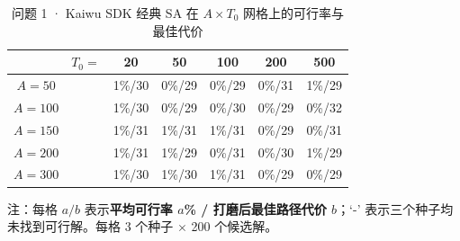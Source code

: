 \begin{table}[htbp]
  \centering
  \caption{问题 1 · Kaiwu SDK 经典 SA 在 $A \times T_0$ 网格上的可行率与最佳代价}
  \label{tab:q1_sens_A_T0}
  \begin{tabular}{ccccccc}
    \toprule
    & $T_0=$ & 20 & 50 & 100 & 200 & 500 \\
    \midrule
    $A=50$ & & 1\%/30 & 0\%/29 & 0\%/29 & 0\%/31 & 1\%/29 \\
    $A=100$ & & 1\%/30 & 0\%/29 & 0\%/30 & 0\%/29 & 0\%/32 \\
    $A=150$ & & 1\%/31 & 1\%/31 & 1\%/31 & 0\%/29 & 0\%/31 \\
    $A=200$ & & 1\%/31 & 1\%/29 & 0\%/31 & 0\%/30 & 1\%/29 \\
    $A=300$ & & 1\%/30 & 1\%/30 & 1\%/31 & 0\%/29 & 0\%/29 \\
    \bottomrule
  \end{tabular}
  \begin{flushleft}\footnotesize
  注：每格 $a/b$ 表示\textbf{平均可行率 $a$\% / 打磨后最佳路径代价 $b$}；`-' 表示三个种子均未找到可行解。每格 3 个种子 $\times$ 200 个候选解。
  \end{flushleft}
\end{table}